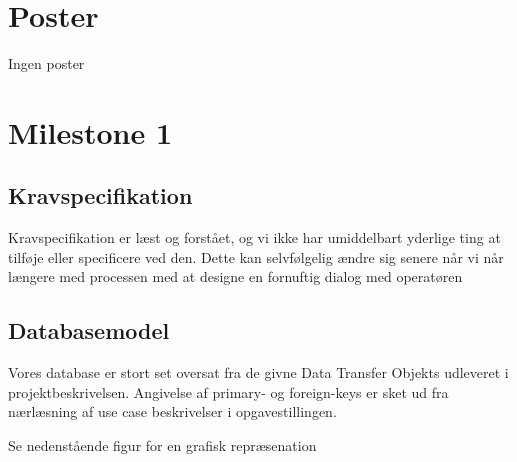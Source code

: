 \documentclass[a4paper]{article}
\begin{document}
\clearpage

\section{Poster} %
\label{sec:Poster}

Ingen poster


\clearpage

\section{Milestone 1} %
\label{sec:Milestone 1}

\subsection{Kravspecifikation} %
\label{sub:Kravspecifikation}

Kravspecifikation er læst og forstået, og vi ikke har umiddelbart yderlige ting at tilføje eller specificere ved den. Dette kan selvfølgelig ændre sig senere når vi når længere med processen med at designe en fornuftig dialog med operatøren


\subsection{Databasemodel} %
\label{sub:Databasemodel}

Vores database er stort set oversat fra de givne Data Transfer Objekts udleveret i projektbeskrivelsen. Angivelse af primary- og foreign-keys er sket ud fra nærlæsning af use case beskrivelser i opgavestillingen.

Se nedenstående figur for en grafisk repræsenation
\end{document}
